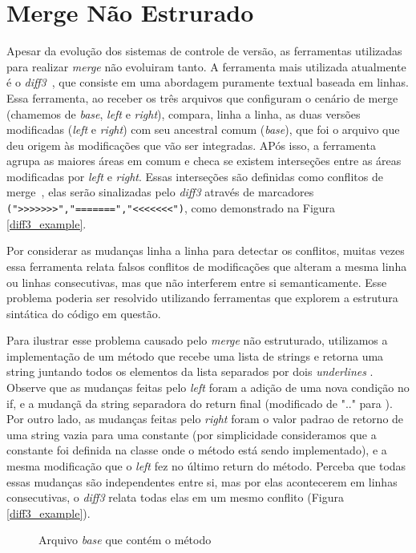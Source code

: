 \section{Merge Não Estrurado}
Apesar da evolução dos sistemas de controle de versão, as ferramentas utilizadas para realizar
\emph{merge} não evoluiram tanto. A ferramenta mais utilizada atualmente é o \emph{diff3}~\cite{mens02}, que consiste em uma
abordagem puramente textual baseada em linhas. Essa ferramenta, ao receber os três arquivos que configuram o cenário de merge
(chamemos de \emph{base}, \emph{left} e \emph{right}), compara, linha a linha, as duas versões modificadas
(\emph{left} e \emph{right}) com seu ancestral comum (\emph{base}), que foi o arquivo que deu origem às modificações
que vão ser integradas. APós isso, a ferramenta agrupa as maiores áreas em comum e checa se existem interseções entre as
áreas modificadas por \emph{left} e \emph{right}. Essas interseções são definidas como conflitos de merge~\cite{khan07},
elas serão sinalizadas pelo \emph{diff3} através de marcadores \verb|(">>>>>>>","=======","<<<<<<<")|, como demonstrado na
Figura \ref{diff3_example}.

Por considerar as mudanças linha a linha para detectar os conflitos, muitas vezes essa ferramenta relata falsos conflitos
de modificações que alteram a mesma linha ou linhas consecutivas, mas que não interferem entre si semanticamente.
Esse problema poderia ser resolvido utilizando ferramentas que explorem a estrutura sintática do código em questão.

Para ilustrar esse problema causado pelo \emph{merge} não estruturado, utilizamos a implementação de um método
 que
recebe uma lista de strings e retorna uma string juntando todos os elementos da lista separados por dois
\emph{underlines} . Observe que as mudanças feitas pelo \emph{left} foram a adição de uma nova
condição no if, e a mudançã da string separadora do return final (modificado de ".." para ). Por outro lado,
as mudanças feitas pelo \emph{right} foram o valor padrao de retorno de uma string vazia para uma constante (por simplicidade
consideramos que a constante foi definida na classe onde o método está sendo implementado), e a mesma
modificação que o \emph{left} fez no último return do método. Perceba que todas essas mudanças são independentes entre si,
mas por elas acontecerem em linhas consecutivas, o \emph{diff3} relata todas elas em um mesmo conflito (Figura
\ref{diff3_example}).

\begin{figure}[ht]
	\begin{center}
		
		\caption{Arquivo \emph{base} que contém o método }\label{base_example}
	\end{center}
\end{figure}

